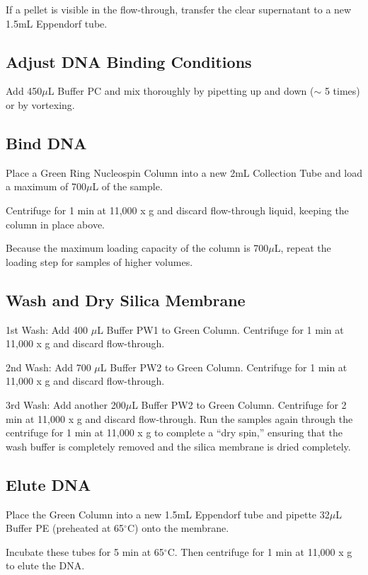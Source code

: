 \documentclass[12pt]{../SOP3_alpha}\usepackage[]{graphicx}\usepackage[]{color}
\begin{document}
\NP If a pellet is visible in the flow-through, transfer the clear supernatant to a new 1.5mL Eppendorf tube. 


\subsection*{Adjust DNA Binding Conditions}

\NP Add 450$\mu$L Buffer PC and mix thoroughly by pipetting up and down ($\sim$ 5 times) or by vortexing.


\subsection*{Bind DNA}

\NP Place a Green Ring Nucleospin Column into a new 2mL Collection Tube and load a maximum of 700$\mu$L of the sample.

\NP Centrifuge for 1 min at 11,000 x g and discard flow-through liquid, keeping the column in place above. 

\NP Because the maximum loading capacity of the column is 700$\mu$L, repeat the loading step for samples of higher volumes.

\subsection*{Wash and Dry Silica Membrane}

\NP 1st Wash: Add 400 $\mu$L Buffer PW1 to Green Column. Centrifuge for 1 min at 11,000 x g and discard flow-through.

\NP 2nd Wash: Add 700 $\mu$L Buffer PW2 to Green Column. Centrifuge for 1 min at 11,000 x g and discard flow-through.

\NP 3rd Wash: Add another 200$\mu$L Buffer PW2 to Green Column. Centrifuge for 2 min at 11,000 x g and discard flow-through. Run the samples again through the centrifuge for 1 min at 11,000 x g to complete a ``dry spin,'' ensuring that the wash buffer is completely removed and the silica membrane is dried completely. 

\subsection*{Elute DNA}

\NP Place the Green Column into a new 1.5mL Eppendorf tube and pipette 32$\mu$L Buffer PE (preheated at 65$^\circ$C) onto the membrane. 

\NP Incubate these tubes for 5 min at 65$^\circ$C. Then centrifuge for 1 min at 11,000 x g to elute the DNA.
\end{document}
